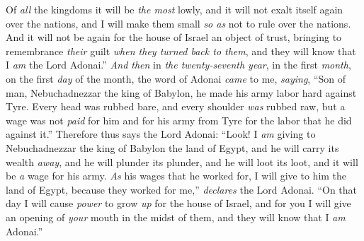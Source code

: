 \begin{biblechapter}
\verse Of \textit{all} the kingdoms it will be \textit{the most} lowly, and it will not exalt itself again over the nations, and I will make them small \textit{so as} not to rule over the nations.
\verse And it will not be again for the house of Israel an object of trust, bringing to remembrance \textit{their} guilt \textit{when they turned back to them}, and they will know that I \textit{am} the Lord Adonai.”
\verse \textit{And then} in \textit{the twenty-seventh year}, in the first \textit{month}, on the first \textit{day} of the month, the word of Adonai \textit{came} to me, \textit{saying},
\verse “Son of man, Nebuchadnezzar the king of Babylon, he made his army labor hard against Tyre. Every head was rubbed bare, and every shoulder \textit{was} rubbed raw, but a wage was not \textit{paid} for him and for his army from Tyre for the labor that he did against it.”
\verse Therefore thus says the Lord Adonai: “Look! I \textit{am} giving to Nebuchadnezzar the king of Babylon the land of Egypt, and he will carry its wealth \textit{away}, and he will plunder its plunder, and he will loot its loot, and it will be \textit{a} wage for his army.
\verse \textit{As} his wages that he worked for, I will give to him the land of Egypt, because they worked for me,” \textit{declares} the Lord Adonai.
\verse “On that day I will cause \textit{power} to grow \textit{up} for the house of Israel, and for you I will give an opening of \textit{your} mouth in the midst of them, and they will know that I \textit{am} Adonai.”
\end{biblechapter}

